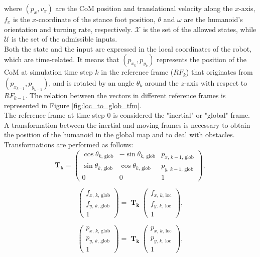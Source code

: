\documentclass[main.tex]{subfiles}
\begin{document}
where $(p_x, v_x)$ are the CoM position and translational velocity along the $x$-axis, $f_x$ is the $x$-coordinate of the stance foot position, $\theta$ and $\omega$ are the humanoid's orientation and turning rate, respectively. $\mathcal{X}$ is the set of the allowed states, while $\mathcal{U}$ is the set of the admissible inputs.\\
Both the state and the input are expressed in the local coordinates of the robot, which are time-related. It means that $(p_{x_k}, p_{y_k})$ represents the position of the CoM at simulation time step $k$ in the reference frame ($RF_k$) that originates from $(p_{x_{k-1}}, p_{y_{k-1}})$, and is rotated by an angle $\theta_k$ around the $z$-axis with respect to $RF_{k-1}$. The relation between the vectors in different reference frames is represented in Figure \ref{fig:loc_to_glob_tfm}.\\
The reference frame at time step 0 is considered the "inertial" or "global" frame. A transformation between the inertial and moving frames is necessary to obtain the position of the humanoid in the global map and to deal with obstacles. Transformations are performed as follows:
$$
\mathbf{T_k} = \begin{pmatrix}
\cos\theta_{k,\, \text{glob}} & -\sin\theta_{k,\, \text{glob}} & p_{x,\,k-1,\,\text{glob}} \\
\sin\theta_{k,\, \text{glob}} & \cos\theta_{k,\, \text{glob}} &  p_{y,\,k-1,\,\text{glob}} \\
0 & 0 & 1
\end{pmatrix},
$$

$$
\begin{pmatrix} f_{x,\,k,\,\text{glob} } \\ f_{y,\,k,\,\text{glob}} \\ 1 \end{pmatrix} = \; \mathbf{T_k} \;
\begin{pmatrix}
f_{x,\,k,\,\text{loc} } \\ f_{y,\,k,\,\text{loc}} \\ 1
\end{pmatrix},
$$

$$
\begin{pmatrix} p_{x,\,k,\,\text{glob} } \\ p_{y,\,k,\,\text{glob}} \\ 1 \end{pmatrix} = \; \mathbf{T_k} \;
\begin{pmatrix}
p_{x,\,k,\,\text{loc} } \\ p_{y,\,k,\,\text{loc}} \\ 1
\end{pmatrix},
$$
\end{document}
